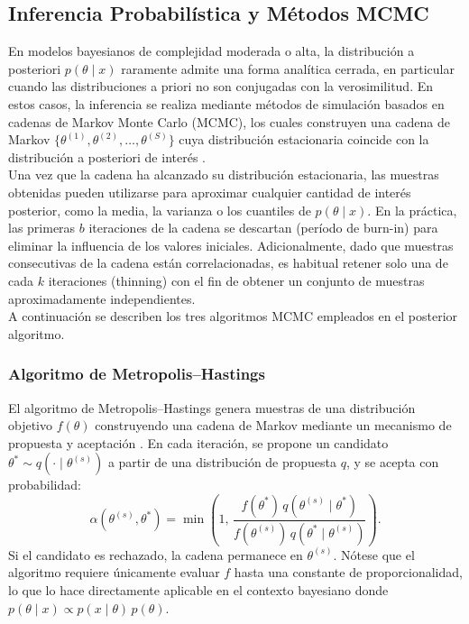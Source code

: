 \subsection{Inferencia Probabilística y Métodos MCMC}
\label{02_03_02_inferencia_probabilistica}

En modelos bayesianos de complejidad moderada o alta, la distribución a posteriori $p(\theta \mid x)$ raramente admite una forma analítica cerrada, en particular cuando las distribuciones a priori no son conjugadas con la verosimilitud. En estos casos, la inferencia se realiza mediante métodos de simulación basados en cadenas de Markov Monte Carlo (MCMC), los cuales construyen una cadena de Markov $\{\theta^{(1)}, \theta^{(2)}, \dots, \theta^{(S)}\}$ cuya distribución estacionaria coincide con la distribución a posteriori de interés \cite{02_07_rizzo2007statistical}.\\

Una vez que la cadena ha alcanzado su distribución estacionaria, las muestras obtenidas pueden utilizarse para aproximar cualquier cantidad de interés posterior, como la media, la varianza o los cuantiles de $p(\theta \mid x)$. En la práctica, las primeras $b$ iteraciones de la cadena se descartan (período de burn-in) para eliminar la influencia de los valores iniciales. Adicionalmente, dado que muestras consecutivas de la cadena están correlacionadas, es habitual retener solo una de cada $k$ iteraciones (thinning) con el fin de obtener un conjunto de muestras aproximadamente independientes.\\

A continuación se describen los tres algoritmos MCMC empleados en el posterior algoritmo.

\subsubsection{Algoritmo de Metropolis–Hastings}
\label{02_03_02_01_metropolis_hastings}
El algoritmo de Metropolis--Hastings genera muestras de una distribución objetivo $f(\theta)$ construyendo una cadena de Markov mediante un mecanismo de propuesta y aceptación \cite{02_07_rizzo2007statistical}. En cada iteración, se propone un candidato $\theta^* \sim q(\cdot \mid \theta^{(s)})$ a partir de una distribución de propuesta $q$, y se acepta con probabilidad:
\begin{equation}
    \alpha(\theta^{(s)}, \theta^*) = \min\!\left(1,\,
    \frac{f(\theta^*)\, q(\theta^{(s)} \mid \theta^*)}
         {f(\theta^{(s)})\, q(\theta^* \mid \theta^{(s)})}\right).
\end{equation}
Si el candidato es rechazado, la cadena permanece en $\theta^{(s)}$. Nótese que el algoritmo requiere únicamente evaluar $f$ hasta una constante de proporcionalidad, lo que lo hace directamente aplicable en el contexto bayesiano donde $p(\theta \mid x) \propto p(x \mid \theta)\, p(\theta)$.

